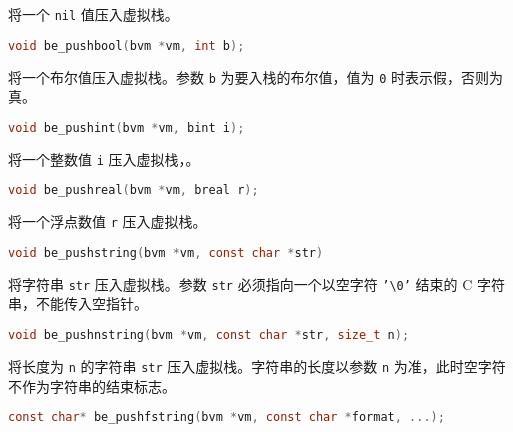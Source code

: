 将一个 \texttt{nil} 值压入虚拟栈。


\begin{lstlisting}[language=c, style=berry, numbers=none]
void be_pushbool(bvm *vm, int b);
\end{lstlisting}

将一个布尔值压入虚拟栈。参数 \texttt{b} 为要入栈的布尔值，值为 \texttt{0} 时表示假，否则为真。


\begin{lstlisting}[language=c, style=berry, numbers=none]
void be_pushint(bvm *vm, bint i);
\end{lstlisting}

将一个整数值 \texttt{i} 压入虚拟栈，。


\begin{lstlisting}[language=c, style=berry, numbers=none]
void be_pushreal(bvm *vm, breal r);
\end{lstlisting}

将一个浮点数值 \texttt{r} 压入虚拟栈。


\begin{lstlisting}[language=c, style=berry, numbers=none]
void be_pushstring(bvm *vm, const char *str)
\end{lstlisting}

将字符串 \texttt{str} 压入虚拟栈。参数 \texttt{str} 必须指向一个以空字符 \texttt{'\textbackslash 0'} 结束的 C 字符串，不能传入空指针。


\begin{lstlisting}[language=c, style=berry, numbers=none]
void be_pushnstring(bvm *vm, const char *str, size_t n);
\end{lstlisting}

将长度为 \texttt{n} 的字符串 \texttt{str} 压入虚拟栈。字符串的长度以参数 \texttt{n} 为准，此时空字符不作为字符串的结束标志。


\begin{lstlisting}[language=c, style=berry, numbers=none]
const char* be_pushfstring(bvm *vm, const char *format, ...);
\end{lstlisting}

